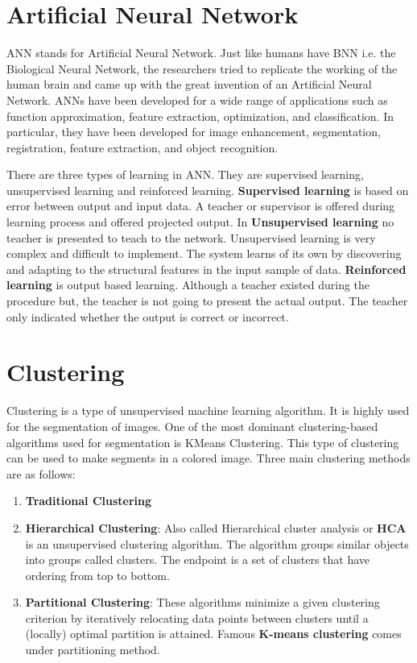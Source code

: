 \section{Artificial Neural Network}

ANN stands for Artificial Neural Network. Just like humans have BNN i.e. the Biological Neural Network, the researchers tried to replicate the working of the human brain and came up with the great invention of an Artificial Neural Network. ANNs have been developed for a wide range of applications such as function approximation, feature extraction, optimization, and classification. In particular, they have been developed for image enhancement, segmentation, registration, feature extraction, and object recognition.

There are three types of learning in ANN. They are supervised learning, unsupervised learning and reinforced learning. \textbf{Supervised learning} is based on error between output and input data. A teacher or supervisor is offered during learning process and offered projected output. In \textbf{Unsupervised learning} no teacher is presented to teach to the network. Unsupervised learning is very complex and difficult to implement. The system learns of its own by discovering and adapting to the structural features in the input sample of data. \textbf{Reinforced learning} is output based learning. Although a teacher existed during the procedure but, the teacher is not going to present the actual output. The teacher only indicated whether the output is correct or incorrect.

\section{Clustering}
Clustering is a type of unsupervised machine learning algorithm. It is highly used for the segmentation of images. One of the most dominant clustering-based algorithms used for segmentation is KMeans Clustering. This type of clustering can be used to make segments in a colored image. Three main clustering methods are as follows:

\begin{enumerate}
	\item \textbf{Traditional Clustering}
	\item \textbf{Hierarchical Clustering}: Also called Hierarchical cluster analysis or \textbf{HCA} is an unsupervised clustering algorithm. The algorithm groups similar objects into groups called clusters. The endpoint is a set of clusters that have ordering from top to bottom.
	\item \textbf{Partitional Clustering}: These algorithms minimize a given clustering criterion by iteratively relocating data points between clusters until a (locally) optimal partition is attained. Famous \textbf{K-means clustering} comes under partitioning method.
\end{enumerate} 


